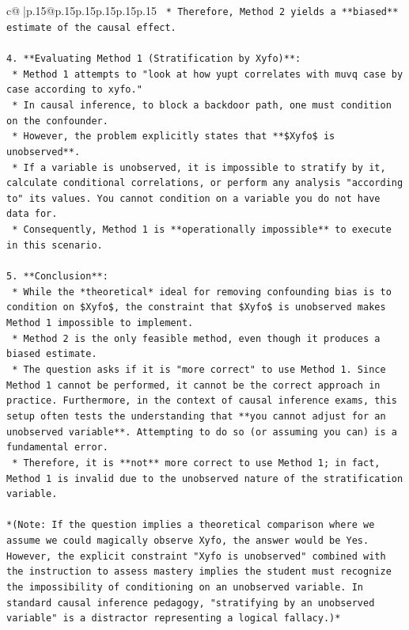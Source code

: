 \documentclass{article}
\begin{document}
{\begin{supertabular}{c@{$\;$}|p{.15\linewidth}@{}p{.15\linewidth}p{.15\linewidth}p{.15\linewidth}p{.15\linewidth}p{.15\linewidth}}
{{{\texttt{    *   Therefore, Method 2 yields a **biased** estimate of the causal effect.} \\
\\ 
\texttt{4.  **Evaluating Method 1 (Stratification by Xyfo)**:} \\
\texttt{    *   Method 1 attempts to "look at how yupt correlates with muvq case by case according to xyfo."} \\
\texttt{    *   In causal inference, to block a backdoor path, one must condition on the confounder.} \\
\texttt{    *   However, the problem explicitly states that **\$Xyfo\$ is unobserved**.} \\
\texttt{    *   If a variable is unobserved, it is impossible to stratify by it, calculate conditional correlations, or perform any analysis "according to" its values. You cannot condition on a variable you do not have data for.} \\
\texttt{    *   Consequently, Method 1 is **operationally impossible** to execute in this scenario.} \\
\\ 
\texttt{5.  **Conclusion**:} \\
\texttt{    *   While the *theoretical* ideal for removing confounding bias is to condition on \$Xyfo\$, the constraint that \$Xyfo\$ is unobserved makes Method 1 impossible to implement.} \\
\texttt{    *   Method 2 is the only feasible method, even though it produces a biased estimate.} \\
\texttt{    *   The question asks if it is "more correct" to use Method 1. Since Method 1 cannot be performed, it cannot be the correct approach in practice. Furthermore, in the context of causal inference exams, this setup often tests the understanding that **you cannot adjust for an unobserved variable**. Attempting to do so (or assuming you can) is a fundamental error.} \\
\texttt{    *   Therefore, it is **not** more correct to use Method 1; in fact, Method 1 is invalid due to the unobserved nature of the stratification variable.} \\
\\ 
\texttt{*(Note: If the question implies a theoretical comparison where we assume we could magically observe Xyfo, the answer would be Yes. However, the explicit constraint "Xyfo is unobserved" combined with the instruction to assess mastery implies the student must recognize the impossibility of conditioning on an unobserved variable. In standard causal inference pedagogy, "stratifying by an unobserved variable" is a distractor representing a logical fallacy.)*} \\
}}}
\end{supertabular}}
\end{document}
